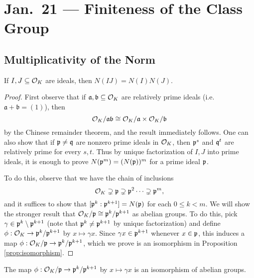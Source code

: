 \chapter{Jan.~21 --- Finiteness of the Class Group}

\section{Multiplicativity of the Norm}

\begin{theorem}
  If $I, J \subseteq \mathcal{O}_K$ are ideals, then
  $N(IJ) = N(I) N(J)$.
\end{theorem}

\begin{proof}
  First observe that if $\mathfrak{a}, \mathfrak{b} \subseteq \mathcal{O}_K$ are
  relatively prime ideals (i.e. $\mathfrak{a} + \mathfrak{b} = (1)$), then
  \[
    \mathcal{O}_K / \mathfrak{a} \mathfrak{b} \cong \mathcal{O}_K / \mathfrak{a} \times \mathcal{O}_K / \mathfrak{b}
  \]
  by the Chinese remainder theorem, and
  the result immediately follows. One can also
  show that if $\mathfrak{p} \ne \mathfrak{q}$ are nonzero prime ideals in
  $\mathcal{O}_K$, then
  $\mathfrak{p}^s$ and $\mathfrak{q}^t$ are relatively prime for every
  $s, t$. Thus by unique factorization of $I, J$ into
  prime ideals,
  it is enough to prove $N(\mathfrak{p}^m) = (N(\mathfrak{p}))^m$
  for a prime ideal $\mathfrak{p}$.

  To do this, observe that we have the chain of inclusions
  \[
    \mathcal{O}_K \supsetneq \mathfrak{p} \supsetneq \mathfrak{p}^2 \dots \supsetneq \mathfrak{p}^m,
  \]
  and it suffices to show that $[\mathfrak{p}^k : \mathfrak{p}^{k + 1}] = N(\mathfrak{p})$
  for each $0 \le k < m$. We will show the
  stronger result that $\mathcal{O}_K / \mathfrak{p} \cong \mathfrak{p}^k / \mathfrak{p}^{k + 1}$
  as abelian groups. To do this, pick
  $\gamma \in \mathfrak{p}^k \setminus \mathfrak{p}^{k + 1}$ (note
  that $\mathfrak{p}^k \ne \mathfrak{p}^{k + 1}$ by unique factorization)
  and define $\phi : \mathcal{O}_K \to \mathfrak{p}^k / \mathfrak{p}^{k + 1}$
  by $x \mapsto \gamma x$. Since $\gamma x \in \mathfrak{p}^{k + 1}$
  whenever $x \in \mathfrak{p}$, this induces a map
  $\phi : \mathcal{O}_K / \mathfrak{p} \to \mathfrak{p}^k / \mathfrak{p}^{k + 1}$, which
  we prove is an isomorphism in Proposition
  \ref{prop:isomorphism}.
\end{proof}

\begin{prop}\label{prop:isomorphism}
  The map $\phi : \mathcal{O}_K / \mathfrak{p} \to \mathfrak{p}^k / \mathfrak{p}^{k + 1}$
  by $x \mapsto \gamma x$ is an isomorphism
  of abelian groups.
\end{prop}

